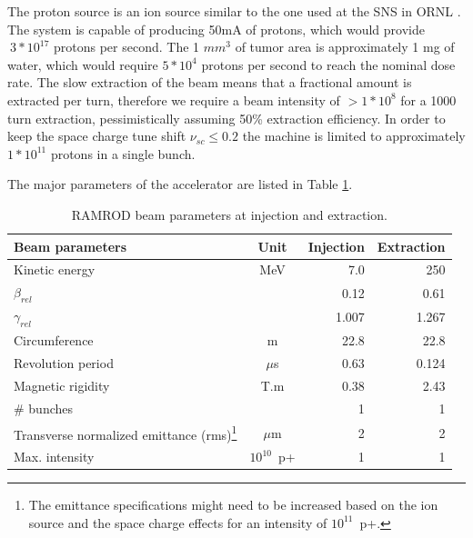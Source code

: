 The proton source is an ion source similar to the one used at the SNS in ORNL \cite{ION}.  The system is capable of producing 50mA of protons, 
which would provide $~3*10^{17}$ protons per second.  The 1 $mm^3$ of tumor area is approximately 1 mg of water, which would require $5*10^4$ protons per second to 
reach the nominal dose rate.  The slow extraction of the beam means that a fractional amount is extracted per turn, therefore we require a beam intensity of 
$>1*10^8$ for a 1000 turn extraction, pessimistically assuming 50\% extraction efficiency.  In order to keep the space charge tune shift 
$\nu_{sc} \le 0.2$ the machine is limited to approximately $1*10^{11}$ protons in a single bunch. 

The major parameters of the accelerator are listed in Table \ref{tab:major}.  
\begin{table}[!hbt]
  \centering
  \begin{tabular}{lcrr}
    \hline 
    \textbf{Beam parameters}&\textbf{Unit}  &\textbf{Injection} &\textbf{Extraction}\\                        
    \hline \hline
    Kinetic energy      & MeV       & 7.0       & 250       \\
    $\beta_{rel}$     &       & 0.12 & 0.61   \\
    $\gamma_{rel}$      &       & 1.007         &1.267  \\
    Circumference   & m   &   22.8      & 22.8    \\
    Revolution period   & $\mu$s    & 0.63        &0.124    \\
    Magnetic rigidity   & T.m     & 0.38        &2.43 \\
    $\#$ bunches      &       &1        &1  \\
    Transverse normalized emittance (rms)\footnote{The emittance specifications might need to be increased based on the ion source and the space charge 
    effects for an intensity of $10^{11}$~p+. } & $\mu$m    & 2       &2\\
    Max. intensity  &   $10^{10}$~p+  &   1   & 1\\

    \hline
  \end{tabular}
  \caption{RAMROD beam parameters at injection and extraction.}
  \label{tab:major}
\end{table}



